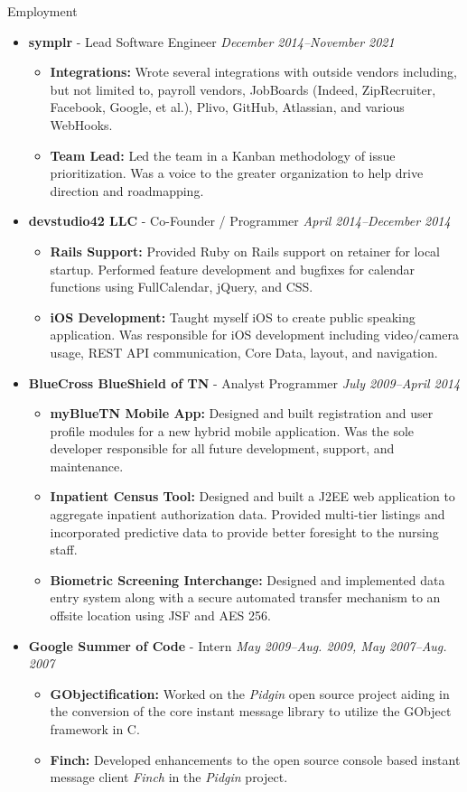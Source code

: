 \documentclass[11pt,oneside]{article}
\newenvironment{ressection}[1]{
	\vspace{4pt}
	{\fontfamily{phv}\selectfont\Large#1}
	\begin{itemize}
	\vspace{3pt}
}{
	\end{itemize}
}
\newcommand{\ressubitem}[1]{
	\vspace{-1pt}
	\item \begin{flushleft} #1 \end{flushleft}
}
\newcommand{\resbigitem}[3]{
	\vspace{-5pt}
	\item
	{\textbf{#1} - #2 \hfill \textit{#3}}
}
\newenvironment{restitledposition}[3]{
	\resbigitem{#1}{#2}{#3}
	\vspace{-2pt}
	\begin{itemize}
}{
	\end{itemize}
}
\begin{document}
\begin{ressection}{Employment}
\begin{restitledposition}{symplr}{Lead Software Engineer}{December 2014--November 2021}
		\ressubitem{\textbf{Integrations:} Wrote several integrations with outside vendors including, but not
		limited to, payroll vendors, JobBoards (Indeed, ZipRecruiter, Facebook, Google, et al.), Plivo, GitHub,
		Atlassian, and various WebHooks.}

		\ressubitem{\textbf{Team Lead:} Led the team in a Kanban methodology of issue prioritization. Was a voice
		to the greater organization to help drive direction and roadmapping.}
  \end{restitledposition}

  \begin{restitledposition}{devstudio42 LLC}{Co-Founder / Programmer}{April 2014--December 2014}
    \ressubitem{\textbf{Rails Support:} Provided Ruby on Rails support on retainer for local startup.
    Performed feature development and bugfixes for calendar functions using FullCalendar, jQuery, and CSS.}
    \ressubitem{\textbf{iOS Development:} Taught myself iOS to create public speaking application.
    Was responsible for iOS development including video/camera usage, REST API communication, 
    Core Data, layout, and navigation.}
  \end{restitledposition}

	\begin{restitledposition}{BlueCross BlueShield of TN}{Analyst Programmer}{July 2009--April 2014}
    \ressubitem{\textbf{myBlueTN Mobile App:} Designed and built registration
    and user profile modules for a new hybrid mobile application. 
    Was the sole developer responsible for all future development, support, and 
    maintenance.}

		\ressubitem{\textbf{Inpatient Census Tool:} Designed and built a J2EE web 
    application to aggregate inpatient authorization data. Provided 
    multi-tier listings and incorporated predictive data to provide	better 
    foresight to the nursing staff.}
		
		\ressubitem{\textbf{Biometric Screening Interchange:} Designed and implemented
    data entry system along with a secure automated transfer mechanism to an
    offsite location using JSF and AES 256.}
	\end{restitledposition}

	\begin{restitledposition}{Google Summer of Code}{Intern}{May 2009--Aug. 2009, May 2007--Aug. 2007}
		\ressubitem{\textbf{GObjectification:} Worked on the \textit{Pidgin} open source project
		aiding in the conversion of the core instant message library to utilize the 
		GObject framework in C.}
	
		\ressubitem{\textbf{Finch:} Developed enhancements to the open source console
		based instant message client \textit{Finch} in the \textit{Pidgin} project.}
	\end{restitledposition}
\end{ressection}
\end{document}
